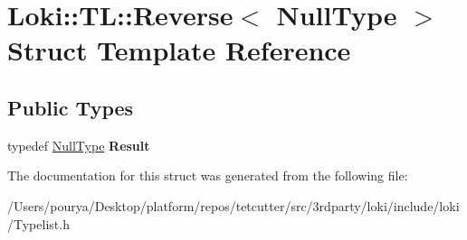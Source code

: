 \hypertarget{structLoki_1_1TL_1_1Reverse_3_01NullType_01_4}{}\section{Loki\+:\+:T\+L\+:\+:Reverse$<$ Null\+Type $>$ Struct Template Reference}
\label{structLoki_1_1TL_1_1Reverse_3_01NullType_01_4}
\subsection*{Public Types}
\begin{DoxyCompactItemize}
\item 
\hypertarget{structLoki_1_1TL_1_1Reverse_3_01NullType_01_4_a91ad679e8fee3ae47498d050982a7ad7}{}typedef \hyperlink{classLoki_1_1NullType}{Null\+Type} {\bfseries Result}\label{structLoki_1_1TL_1_1Reverse_3_01NullType_01_4_a91ad679e8fee3ae47498d050982a7ad7}

\end{DoxyCompactItemize}


The documentation for this struct was generated from the following file\+:\begin{DoxyCompactItemize}
\item 
/\+Users/pourya/\+Desktop/platform/repos/tetcutter/src/3rdparty/loki/include/loki/Typelist.\+h\end{DoxyCompactItemize}
